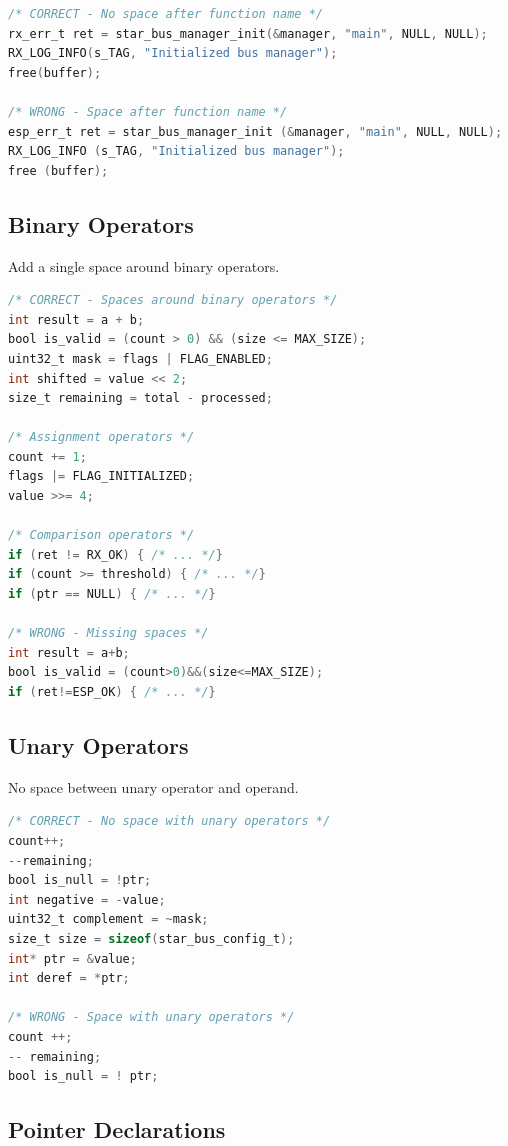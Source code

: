 \begin{lstlisting}[language=C]
/* CORRECT - No space after function name */
rx_err_t ret = star_bus_manager_init(&manager, "main", NULL, NULL);
RX_LOG_INFO(s_TAG, "Initialized bus manager");
free(buffer);

/* WRONG - Space after function name */
esp_err_t ret = star_bus_manager_init (&manager, "main", NULL, NULL);
RX_LOG_INFO (s_TAG, "Initialized bus manager");
free (buffer);
\end{lstlisting}

\subsection{Binary Operators}

Add a single space around binary operators.

\begin{lstlisting}[language=C]
/* CORRECT - Spaces around binary operators */
int result = a + b;
bool is_valid = (count > 0) && (size <= MAX_SIZE);
uint32_t mask = flags | FLAG_ENABLED;
int shifted = value << 2;
size_t remaining = total - processed;

/* Assignment operators */
count += 1;
flags |= FLAG_INITIALIZED;
value >>= 4;

/* Comparison operators */
if (ret != RX_OK) { /* ... */}
if (count >= threshold) { /* ... */}
if (ptr == NULL) { /* ... */}

/* WRONG - Missing spaces */
int result = a+b;
bool is_valid = (count>0)&&(size<=MAX_SIZE);
if (ret!=ESP_OK) { /* ... */}
\end{lstlisting}

\subsection{Unary Operators}

No space between unary operator and operand.

\begin{lstlisting}[language=C]
/* CORRECT - No space with unary operators */
count++;
--remaining;
bool is_null = !ptr;
int negative = -value;
uint32_t complement = ~mask;
size_t size = sizeof(star_bus_config_t);
int* ptr = &value;
int deref = *ptr;

/* WRONG - Space with unary operators */
count ++;
-- remaining;
bool is_null = ! ptr;
\end{lstlisting}

\subsection{Pointer Declarations}

